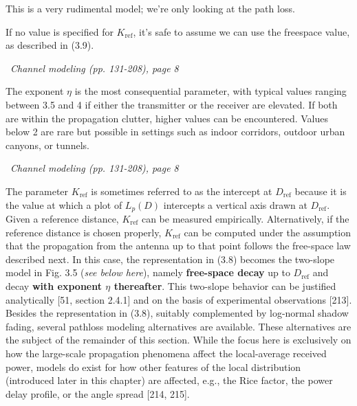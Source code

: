 \documentclass[a4paper, 12pt]{book}
\begin{document}
\begin{greenbar}
This is a very rudimental model; we're only looking at the path loss.
\end{greenbar}

\begin{greenbox}
If no value is specified for $K_{\text{ref}}$, it's safe to assume we can use the freespace value, as described in (3.9).
\end{greenbox}

\begin{yellowbox}
\faBook\ \textit{Channel modeling (pp. 131-208), page 8}

The exponent $\eta$ is the most consequential parameter, with typical values ranging between 3.5 and 4 if either the transmitter or the receiver are elevated. If both are within the propagation clutter, higher values can be encountered. Values below 2 are rare but possible in settings such as indoor corridors, outdoor urban canyons, or tunnels.
\end{yellowbox}

\begin{yellowbox}
\faBook\ \textit{Channel modeling (pp. 131-208), page 8}

The parameter $K_{\text{ref}}$ is sometimes referred to as the intercept at $D_{\text{ref}}$ because it is the value at which a plot of $L_p(D)$ intercepts a vertical axis drawn at $D_{\text{ref}}$. Given a reference distance, $K_{\text{ref}}$ can be measured empirically. Alternatively, if the reference distance is chosen properly, $K_{\text{ref}}$ can be computed under the assumption that the propagation from the antenna up to that point follows the free-space law described next. In this case, the representation in (3.8) becomes the two-slope model in Fig. 3.5 (\textit{see below here}), namely \textbf{free-space decay} up to $D_{\text{ref}}$ and decay \textbf{with exponent $\eta$ thereafter}. This two-slope behavior can be justified analytically [51, section 2.4.1] and on the basis of experimental observations [213]. Besides the representation in (3.8), suitably complemented by log-normal shadow fading, several pathloss modeling alternatives are available. These alternatives are the subject of the remainder of this section. While the focus here is exclusively on how the large-scale propagation phenomena affect the local-average received power, models do exist for how other features of the local distribution (introduced later in this chapter) are affected, e.g., the Rice factor, the power delay profile, or the angle spread [214, 215].
\end{yellowbox}
\end{document}
